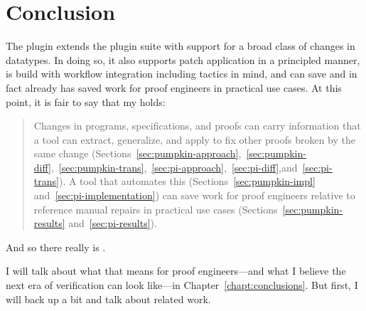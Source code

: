 \section{Conclusion}
\label{sec:pi-concl}

The \toolnamec plugin extends the \sysnamelong plugin suite with support
for a broad class of changes in datatypes.
In doing so, it also supports patch application in a principled manner,
is build with workflow integration including tactics in mind,
and can save and in fact already has saved work for proof engineers in practical use cases.
At this point, it is fair to say that my  holds:

\begin{quote}
Changes in programs, specifications, and proofs can carry information that a tool can extract, generalize, and apply to fix other proofs broken by the same change (Sections~\ref{sec:pumpkin-approach},~\ref{sec:pumpkin-diff},~\ref{sec:pumpkin-trans},~\ref{sec:pi-approach},~\ref{sec:pi-diff},and~\ref{sec:pi-trans}). A tool that automates this (Sections~\ref{sec:pumpkin-impl} and~\ref{sec:pi-implementation}) can save work for proof engineers relative to reference manual repairs in 
practical use cases (Sections~\ref{sec:pumpkin-results} and~\ref{sec:pi-results}).
\end{quote}
And so there really is .

I will talk about what that means for proof engineers---and what I believe the next era of verification can look like---in Chapter~\ref{chapt:conclusions}.
But first, I will back up a bit and talk about related work.
